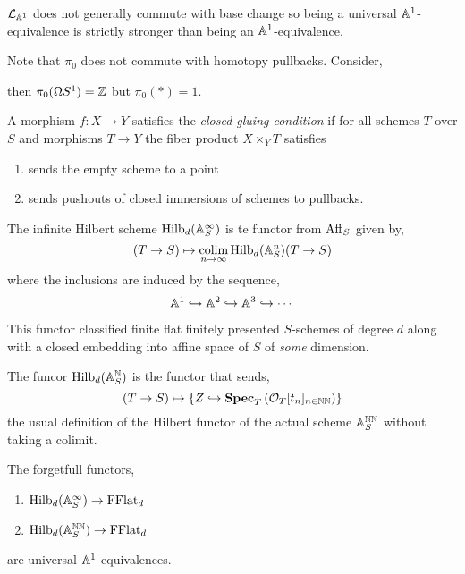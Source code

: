 \documentclass[12pt]{article}
\begin{document}
\begin{rmk}
$\mathcal{L}_{\mathbb{A}^1}$ does not generally commute with base change so being a universal $\mathbb{A}^1$-equivalence is strictly stronger than being an $\mathbb{A}^1$-equivalence.
\end{rmk}

\begin{rmk}
Note that $\pi_0$ does not commute with homotopy pullbacks. Consider,
\begin{center}
\end{center}
then $\pi_0(\Omega S^1) = \mathbb{Z}$ but $\pi_0(*) = 1$. 
\end{rmk}

\begin{defn}
A morphism $f : X \to Y$ satisfies the \textit{closed gluing condition} if for all schemes $T$ over $S$ and morphisms $T \to Y$ the fiber product $X \times_Y T$ satisfies
\begin{enumerate}
\item sends the empty scheme to a point
\item sends pushouts of closed immersions of schemes to pullbacks.
\end{enumerate}
\end{defn}

\begin{defn}
The infinite Hilbert scheme $\mathrm{Hilb}_d(\mathbb{A}^\infty_S)$ is te functor from $\mathrm{Aff}_S$ given by,
\[ (T \to S) \mapsto \operatorname*{\mathrm{colim}}_{n \to \infty} \mathrm{Hilb}_d(\mathbb{A}^n_S)(T \to S) \]
where the inclusions are induced by the sequence,
\[ \mathbb{A}^1 \hookrightarrow \mathbb{A}^2 \hookrightarrow \mathbb{A}^3 \hookrightarrow \cdots \]
\end{defn}

\begin{rmk}
This functor classified finite flat finitely presented $S$-schemes of degree $d$ along with a closed embedding into affine space of $S$ of \textit{some} dimension. 
\end{rmk}

\begin{defn}
The funcor $\mathrm{Hilb}_d(\mathbb{A}^{\mathbb{N}}_S)$ is the functor that sends,
\[ (T \to S) \mapsto \{ Z \hookrightarrow \mathbf{Spec}_{T}\left( \mathcal{O}_{T}[t_n]_{n \in \mathbb{NN}} \right) \} \]
the usual definition of the Hilbert functor of the actual scheme $\mathbb{A}_S^{\mathbb{NN}}$ without taking a colimit. 
\end{defn}

\begin{prop}
The forgetfull functors,
\begin{enumerate}
\item $\mathrm{Hilb}_d(\mathbb{A}_S^{\infty}) \to \mathrm{FFlat}_d$
\item $\mathrm{Hilb}_d(\mathbb{A}_S^{\mathbb{NN}}) \to \mathrm{FFlat}_d$
\end{enumerate}
are universal $\mathbb{A}^1$-equivalences. 
\end{prop}
\end{document}
